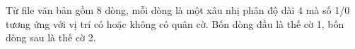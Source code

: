 Từ file văn bản gồm 8 dòng, mỗi dòng là một xâu nhị phân độ dài 4 mà số 1/0 tương ứng với vị trí có hoặc không có quân cờ. Bốn dòng đầu là thế cờ 1, bốn dòng sau là thế cờ 2.  

\